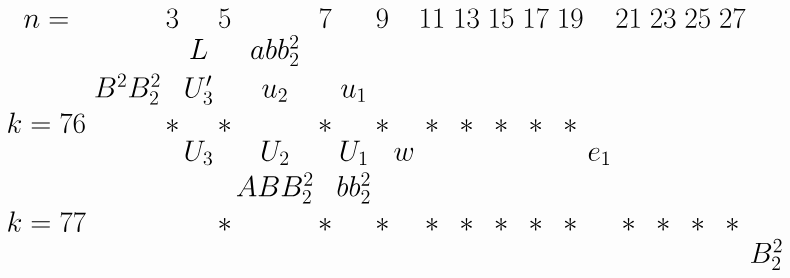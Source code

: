 \documentclass{article}
\begin{document}
\(
\begin{tikzcd}[
nodes={font=\huge,inner sep=0pt},
row sep=0.2cm,
column sep=0.1cm
]
n= && & 3 & & 5 & & 7 & & 9 & & 11 & & 13 & & 15 & & 17 && 19 && 21 && 23 && 25 && 27 \\
&& && L && abb_2^2 && && && &&  \\
&& B^2B_2^2 && U'_3 && u_2 && u_1 \\
k=76 &&& * && * && * && * && * && * && * && * && * && && \\
&& && U_3 && U_2 && U_1 && w && && && && && e_1 \\
&& && && ABB_2^2 && bb_2^2 && &&  \\
k=77 &&& && * && * && * && * && * && * && * && * && * && * && * && * && \\
&& && && && && && && && && && && && && && B_2^2 \\
\\
\end{tikzcd}
\)
\end{document}
